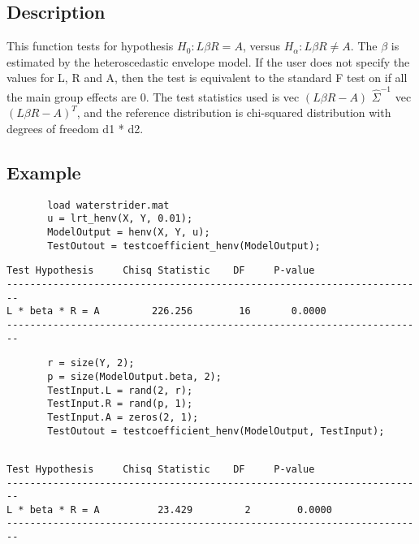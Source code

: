 \documentclass[a4paper,11pt,openany]{memoir}
\begin{document}
\subsection*{Description}

\begin{par}
This function tests for hypothesis $H_0: L\beta R = A$, versus $H_\alpha: L\beta R\neq A$.  The $\beta$ is estimated by the heteroscedastic envelope model.  If the user does not specify the values for L, R and A, then the test is equivalent to the standard F test on if all the main group effects are 0.  The test statistics used is vec $(L\beta R - A)$ $\hat{\Sigma}^{-1}$ vec $(L\beta R - A)^{T}$, and the reference distribution is chi-squared distribution with degrees of freedom d1 * d2.
\end{par} \vspace{1em}


\subsection*{Example}


\begin{verbatim}       load waterstrider.mat
       u = lrt_henv(X, Y, 0.01);
       ModelOutput = henv(X, Y, u);
       TestOutout = testcoefficient_henv(ModelOutput);\end{verbatim}

               \color{lightgray}\ttfamily \begin{verbatim}
Test Hypothesis     Chisq Statistic    DF     P-value
------------------------------------------------------------------------
L * beta * R = A         226.256        16       0.0000
------------------------------------------------------------------------
\end{verbatim} \rmfamily
\color{black}
\begin{verbatim}       r = size(Y, 2);
       p = size(ModelOutput.beta, 2);
       TestInput.L = rand(2, r);
       TestInput.R = rand(p, 1);
       TestInput.A = zeros(2, 1);
       TestOutout = testcoefficient_henv(ModelOutput, TestInput);\end{verbatim}
    

        \color{lightgray}\ttfamily \begin{verbatim}

Test Hypothesis     Chisq Statistic    DF     P-value
------------------------------------------------------------------------
L * beta * R = A          23.429         2        0.0000
------------------------------------------------------------------------
\end{verbatim} \rmfamily
\color{black}
    
\end{document}
